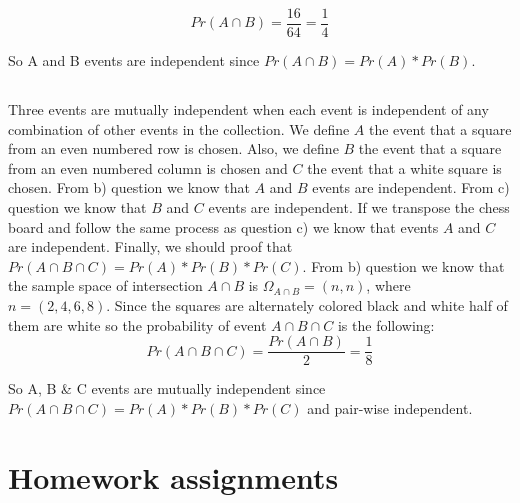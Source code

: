 \documentclass[11pt]{537homework}
\begin{document}
{{{\begin{equation}
  Pr(A \cap B) = \frac{16}{64} = \frac{1}{4}
\end{equation} 

So A and B events are independent since $Pr( A \cap B) = Pr(A) * Pr(B) $.

\subsection{}

Three events are mutually independent when each event is independent of any combination of other events in the collection. We define $A$ the event that a square from an even numbered row is chosen. Also, we define $B$ the event that a square from an even numbered column is chosen and $C$ the event that a white square is chosen. From b) question we know that $A$ and $B$ events are independent. From c) question we know that $B$ and $C$ events are independent. If we transpose the chess board and follow the same process as question c) we know that events $A$ and $C$ are independent. Finally, we should proof that $Pr( A \cap B \cap C) = Pr(A) * Pr(B) * Pr(C)$. From b) question we know that the sample space of intersection $A \cap B$ is $\Omega_{A \cap B} = (n,n)$, where $n=(2,4,6,8)$. Since the squares are alternately colored black and white half of them are white so the probability of event $A \cap B \cap C$ is the following:
\begin{equation}
  Pr(A \cap B \cap C) = \frac{Pr(A \cap B)}{2} = \frac{1}{8}
\end{equation} 

So A, B \& C events are mutually independent since $Pr(A \cap B \cap C) = Pr(A) * Pr(B) * Pr(C)$ and pair-wise independent.


\section{Homework assignments}


\subsection{}

}}}
\end{document}
